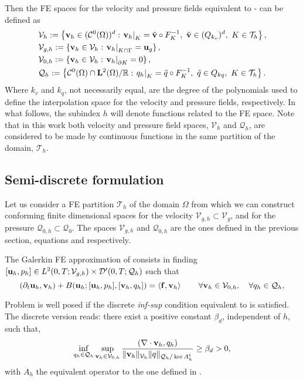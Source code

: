 Then the FE spaces for the velocity and pressure fields equivalent to - can be defined as
\begin{align}
\label{eq-C2_varia_NS_vh_space}
&\mathcal{V}_{h}:=\left\{{\bf v}_h\in(\mathcal{C}^0(\Omega))^d:\left.{\bf v}_h\right|_K=\tilde{{\bf v}}\circ F_K^{-1},\ \tilde{{\bf v}}\in(Q_{k_v})^d,\ K\in\mathcal{T}_h\right\},\\
\label{eq-C2_varia_NS_vgh_space}
&\mathcal{V}_{g,h}:=\left\{{\bf v}_h\in\mathcal{V}_h:\left.{\bf v}_h\right|_{K\cap\Gamma}={\bf u}_g\right\},\\
\label{eq-C2_varia_NS_v0h_space}
&\mathcal{V}_{0,h}:=\left\{{\bf v}_h\in\mathcal{V}_h:\left.{\bf v}_h\right|_{\partial K}=0\right\},\\
\label{eq-C2_varia_NS_qh_space}
&\mathcal{Q}_h:=\left\{\mathcal{C}^0(\Omega)\cap{\bf L}^2(\Omega)/\mathbb{R}:\left.q_h\right|_K=\tilde{q}\circ F_K^{-1},\ \tilde{q}\in Q_{kq},\ K\in\mathcal{T}_h \right\}.
\end{align}
Where $ k_v $ and $ k_q $, not necessarily equal, are the degree of the polynomials used to define the interpolation space for the velocity and pressure fields, respectively. In what follows, the subindex $ h $ will denote functions related to the FE space. Note that in this work both velocity and pressure field spaces, $ \mathcal{V}_h $ and $ \mathcal{Q}_h $, are considered to be made by continuous functions in the same partition of the domain, $ \mathcal{T}_h $.

\subsection{Semi-discrete formulation}
\label{subsec-variational_semidiscrete}
Let us consider a FE partition $ \mathcal{T}_h $ of the domain $ \Omega $ from which we can construct conforming finite dimensional spaces for the velocity $\mathcal{V}_{g,h}\subset\mathcal{V}_g$, and for the pressure $ \mathcal{Q}_{0,h}\subset\mathcal{Q}_0 $. The spaces $\mathcal{V}_{g,h}$ and $ \mathcal{Q}_{0,h} $ are the ones defined in the previous section, equations  and  respectively.

The Galerkin FE approximation of  consists in finding $[{\bf u}_h,p_h]\in {L}^2(0,T;\mathcal{V}_{g,h})\times {\cal D}'(0,T;\mathcal{Q}_h)$ such that
\begin{equation}
\label{eq-C2_NS_weak_discrete}
(\partial_t{\bf u}_h,{\bf v}_h) + B({\bf u}_h;[{\bf u}_h,p_h],[{\bf v}_h,q_h]) = \left<{\bf f},{\bf v}_h\right> 
\quad\quad\forall{\bf v}_h\in\mathcal{V}_{0,h},\quad\forall q_h\in\mathcal{Q}_h,
\end{equation}

Problem  is well posed if the discrete \textit{inf-sup} condition equivalent to  is satisfied. The discrete version reads: there exist a positive constant $ \beta_d $, independent of $ h $, such that,
\begin{equation}
\label{eq-C2_lbb_discrete}
\inf_{q_h\in\mathcal{Q}_h}\sup_{{\bf v}_h\in\mathcal{V}_{0,h}} \frac{(\nabla\cdot{\bf v}_h,q_h)}{\|{\bf v}_h\|_{\mathcal{V}_h}\|q\|_{\mathcal{Q}_h/\ker A_h^t}}\ge\beta_d>0,
\end{equation}
with $ A_h $ the equivalent operator to the one defined in .

